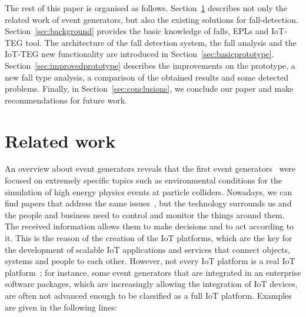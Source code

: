 \documentclass[review]{elsarticle}
\begin{document}
The rest of this paper is organised as follows. Section~\ref{sec:relatedwork}
describes not only the related work of event generators, but also the existing
solutions for fall-detection. Section~\ref{sec:background} provides the basic
knowledge of falls, EPLs and IoT-TEG tool. The architecture
of the fall detection system, the fall analysis and the IoT-TEG new functionality are 
introduced in Section~\ref{sec:basicprototype}. Section~\ref{sec:improvedprototype}
describes the improvements on the prototype, a new fall type analysis,
a comparison of the obtained results and some detected problems. Finally, in Section~\ref{sec:conclusions}, 
we conclude our paper and make recommendations for future work.

\section{Related work}
\label{sec:relatedwork}

An overview about event generators reveals that the first event generators~\cite{dobbs2004houches,mangano2005tools}
were focused on extremely specific topics such as environmental conditions for the simulation of high energy 
physics events at particle colliders. Nowadays, we can find papers that address the same issues~\cite{Grzegorczyk}, but 
the technology surrounds us and the people and business need to control and monitor the things around them. 
The received information allows them to make decisions and to act according to it. This is the reason 
of the creation of the IoT platforms, which are the key for the development of scalable IoT applications and 
services that connect objects, systems and people to each other. However, not every IoT platform is a real IoT 
platform~\cite{iot-analytics:2015}; for instance, some event generators that are integrated in an enterprise 
software packages, which are increasingly allowing the integration of IoT devices, are often not advanced enough
to be classified as a full IoT platform. Examples are given in the following lines:
\end{document}
